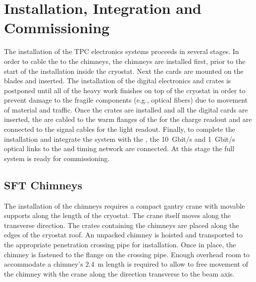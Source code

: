 \section{Installation, Integration and Commissioning}
\label{sec:fddp-tpc-elec-install}

The installation of the TPC electronics systems proceeds in several stages. In order to cable the  to the  chimneys, %
 the chimneys  %
are installed first, prior to the start of the  installation inside the cryostat. %
Next the  cards %
are mounted on the blades and inserted. The installation of the digital electronics and  crates %
is postponed until all of the heavy work finishes on top of the cryostat in order to prevent %
damage to the fragile components (e.g., optical fibers)  %
due to movement of material and traffic. %
Once the  crates are installed and all the digital cards are inserted, the %
 are cabled to the warm flanges of the  for the charge readout and are connected to the  signal cables for the light readout. Finally, to complete the installation and integrate the system with the , the \SI{10}{Gbit/s} and \SI{1}{Gbit/s} optical links to the  and  timing network are connected. At this stage the full system is ready for commissioning. 


\subsection{SFT Chimneys}
\label{sec:fddp-tpc-elec-install-sft}

The installation of the  chimneys requires a compact gantry crane with %
movable supports along the length of the cryostat. The crane itself moves along the transverse direction. The crates containing the  chimneys are placed along the edges of the cryostat roof. An unpacked chimney is hoisted and transported to %
the appropriate penetration crossing pipe for installation. Once in place, the chimney is fastened to the flange on the crossing pipe. %
Enough overhead room to accommodate a chimney's \SI{2.4}{m} length is required
to allow to free movement of the chimney with the crane along the direction transverse to the beam axis. 

